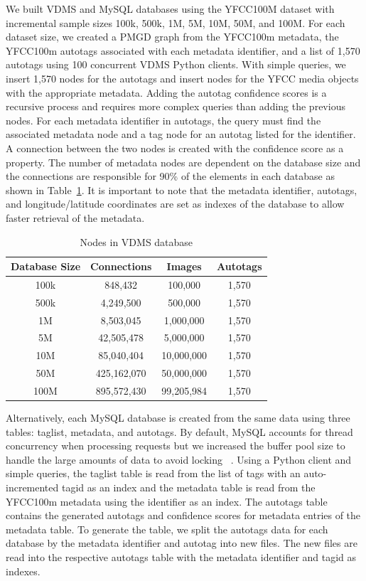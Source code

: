 We built VDMS and MySQL databases using the YFCC100M dataset with incremental sample sizes 100k, 500k, 1M, 5M, 10M, 50M, and 100M. For each dataset size, we created a PMGD graph from the YFCC100m metadata, the YFCC100m autotags associated with each metadata identifier, and a list of 1,570 autotags using 100 concurrent VDMS Python clients.  With simple queries, we insert 1,570 nodes for the autotags and insert nodes for the YFCC media objects with the appropriate metadata.  Adding the autotag confidence scores is a recursive process and requires more complex queries than adding the previous nodes. For each metadata identifier in autotags, the query must find the associated metadata node and a tag node for an autotag listed for the identifier.  A connection between the two nodes is created with the confidence score as a property. The number of metadata nodes are dependent on the database size and the connections are responsible for 90\% of the elements in each database as shown in Table~\ref{table:vdmsnodes}. It is important to note that the metadata identifier, autotags, and longitude/latitude coordinates are set as indexes of the database to allow faster retrieval of the metadata. 

\begin{table}[h]
\caption{Nodes in VDMS database}
\centering
\begin{tabular}{c c c c}
\hline\hline
Database Size & Connections & Images & Autotags\\
\hline
100k & 848,432 & 100,000 & 1,570\\
500k & 4,249,500 & 500,000 & 1,570\\
1M & 8,503,045 & 1,000,000 & 1,570\\
5M & 42,505,478 & 5,000,000 & 1,570\\
10M & 85,040,404 & 10,000,000 & 1,570\\
50M & 425,162,070 & 50,000,000 & 1,570\\
100M & 895,572,430 & 99,205,984 & 1,570\\
\hline
\end{tabular}
\label{table:vdmsnodes}
\end{table} 

Alternatively, each MySQL database is created from the same data using three tables: taglist, metadata, and autotags.  By default, MySQL accounts for thread concurrency when processing requests but we increased the buffer pool size to handle the large amounts of data to avoid locking ~\cite{mysql}. Using a Python client and simple queries, the taglist table is read from the list of tags with an auto-incremented tagid as an index and the metadata table is read from the YFCC100m metadata using the identifier as an index. The autotags table contains the generated autotags and confidence scores for metadata entries of the metadata table. To generate the table, we split the autotags data for each database by the metadata identifier and autotag into new files. The new files are read into the respective autotags table with the metadata identifier and tagid as indexes.  

